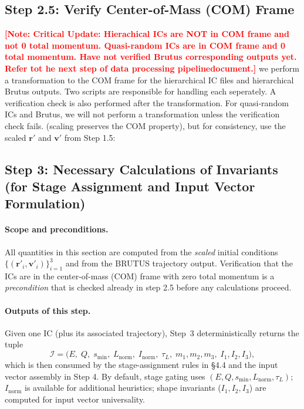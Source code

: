 \documentclass{article}
\newcommand{\authcomment}[1]{\textcolor{Red}{\textbf{[#1]}}}
\begin{document}
\subsection{Step 2.5: Verify Center-of-Mass (COM) Frame} 
\authcomment{Note: Critical Update: Hierachical ICs are NOT in COM frame and not 0 total momentum. Quasi-random ICs are in COM frame and 0 total momentum.
Have not verified Brutus corresponding outputs yet. Refer tot he next step of data processing pipelinedocument.}
we perform a transformation to the COM frame for the hierarchical IC files and hierarchical Brutus outputs. Two scripts are responsible for handling
each seperately. A verification check is also performed after the transformation. For quasi-random ICs and Brutus, we will not perform a transformation
unless the verification check fails. 
(scaling preserves the COM property), but for consistency, use the scaled \(\mathbf{r}'\) and \(\mathbf{v}'\) from Step 1.5:











\subsection{Step 3: Necessary Calculations of Invariants (for Stage Assignment and Input Vector Formulation)}
\label{sec:ctl:step3}

\paragraph{Scope and preconditions.}
All quantities in this section are computed from the \emph{scaled} initial conditions
$\{(\mathbf r'_i,\mathbf v'_i)\}_{i=1}^3$ and from the BRUTUS trajectory output.
Verification that the ICs are in the center-of-mass (COM) frame with zero total momentum
is a \emph{precondition} that is checked already in step 2.5 before any calculations proceed.


\paragraph{Outputs of this step.}
Given one IC (plus its associated trajectory), Step~3 deterministically returns the tuple
\[
\mathcal{I} = \big(E,\;Q,\;s_{\min},\;L_{\mathrm{norm}},\;I_{\mathrm{norm}},\; \tau_L,\; m_1, m_2, m_3,\; I_1, I_2, I_3 \big),
\]
which is then consumed by the stage-assignment rules in \S4.4 and the input vector assembly in Step 4. 
By default, stage gating uses $(E,Q,s_{\min},L_{\mathrm{norm}},\tau_L)$; $I_{\mathrm{norm}}$ is available for additional heuristics; 
shape invariants ($I_1, I_2, I_3$) are computed for input vector universality.
\end{document}
